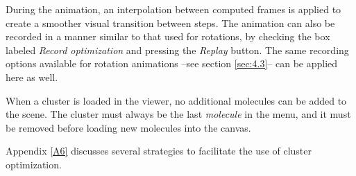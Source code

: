 \documentclass[10pt]{article}
\begin{document}
During the animation, an interpolation between computed frames is applied to create a  
smoother visual transition between steps.  
The animation can also be recorded  
in a manner similar to that used for rotations,  
by checking the box labeled {\it Record optimization} and pressing the {\it Replay} button.  
The same recording options available for rotation animations --see section \ref{sec:4.3}--  
can be applied here as well.

When a cluster is loaded in the viewer, no additional molecules can be added to the scene.  
The cluster must always be the last {\it molecule} in the menu, and it must be removed  
before loading new molecules into the canvas.

Appendix \ref{A6} discusses several strategies to facilitate the use of cluster optimization.


\vspace*{5mm}
\end{document}
